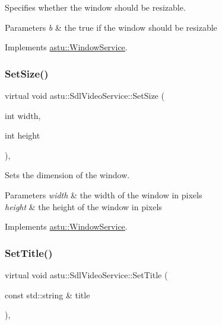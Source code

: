 Specifies whether the window should be resizable.


\begin{DoxyParams}{Parameters}
{\em b} & the {\ttfamily true} if the window should be resizable \\
\hline
\end{DoxyParams}


Implements \hyperlink{classastu_1_1WindowService_a78bee95831f4497fcee7b8d10575f0d8}{astu\+::\+Window\+Service}.

\mbox{\label{classastu_1_1SdlVideoService_a1c8d729ef42024bc0cc5065ecc6631c8}} 
\subsubsection{\texorpdfstring{Set\+Size()}{SetSize()}}
{\footnotesize\ttfamily virtual void astu\+::\+Sdl\+Video\+Service\+::\+Set\+Size (\begin{DoxyParamCaption}\item[{int}]{width,  }\item[{int}]{height }\end{DoxyParamCaption})\hspace{0.3cm}{\ttfamily [override]}, {\ttfamily [virtual]}}

Sets the dimension of the window.


\begin{DoxyParams}{Parameters}
{\em width} & the width of the window in pixels \\
\hline
{\em height} & the height of the window in pixels \\
\hline
\end{DoxyParams}


Implements \hyperlink{classastu_1_1WindowService_a77fb8b7272b58e39c7d003923034eedf}{astu\+::\+Window\+Service}.

\mbox{\label{classastu_1_1SdlVideoService_aad3c873db481dd622d6ddcea70b279af}} 
\subsubsection{\texorpdfstring{Set\+Title()}{SetTitle()}}
{\footnotesize\ttfamily virtual void astu\+::\+Sdl\+Video\+Service\+::\+Set\+Title (\begin{DoxyParamCaption}\item[{const std\+::string \&}]{title }\end{DoxyParamCaption})\hspace{0.3cm}{\ttfamily [override]}, {\ttfamily [virtual]}}

